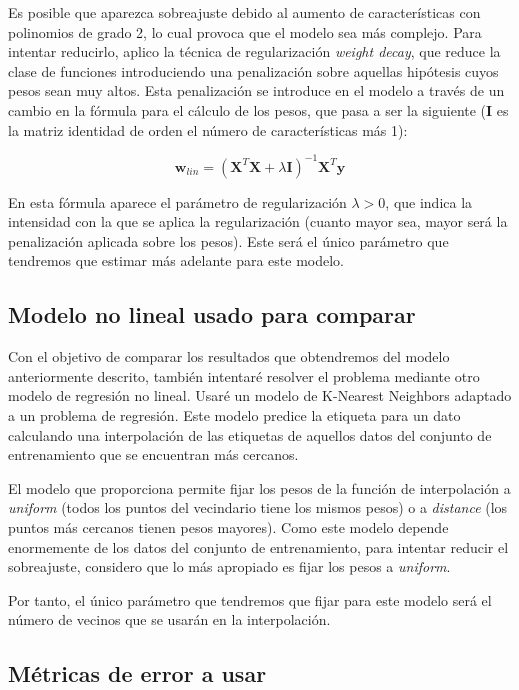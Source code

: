 \documentclass[10pt,a4paper]{article}
\begin{document}
Es posible que aparezca sobreajuste debido al aumento de características con polinomios de grado 2, lo cual provoca que el modelo sea más complejo. Para intentar reducirlo, aplico la técnica de regularización \textit{weight decay}, que reduce la clase de funciones introduciendo una penalización sobre aquellas hipótesis cuyos pesos sean muy altos. Esta penalización se introduce en el modelo a través de un cambio en la fórmula para el cálculo de los pesos, que pasa a ser la siguiente ($\textbf{I}$ es la matriz identidad de orden el número de características más 1):

$$\textbf{w}_{lin} = (\textbf{X}^T \textbf{X} + \lambda \textbf{I})^{-1}\textbf{X}^T \textbf{y}$$

En esta fórmula aparece el parámetro de regularización $\lambda > 0$, que indica la intensidad con la que se aplica la regularización (cuanto mayor sea, mayor será la penalización aplicada sobre los pesos). Este será el único parámetro que tendremos que estimar más adelante para este modelo.

\subsection{Modelo no lineal usado para comparar}

Con el objetivo de comparar los resultados que obtendremos del modelo anteriormente descrito, también intentaré resolver el problema mediante otro modelo de regresión no lineal. Usaré un modelo de K-Nearest Neighbors adaptado a un problema de regresión. Este modelo predice la etiqueta para un dato calculando una interpolación de las etiquetas de aquellos datos del conjunto de entrenamiento que se encuentran más cercanos.

El modelo  que proporciona  permite fijar los pesos de la función de interpolación a \textit{uniform} (todos los puntos del vecindario tiene los mismos pesos) o a \textit{distance} (los puntos más cercanos tienen pesos mayores). Como este modelo depende enormemente de los datos del conjunto de entrenamiento, para intentar reducir el sobreajuste, considero que lo más apropiado es fijar los pesos a \textit{uniform}.

Por tanto, el único parámetro que tendremos que fijar para este modelo será el número de vecinos que se usarán en la interpolación.



\subsection{Métricas de error a usar}
\end{document}
